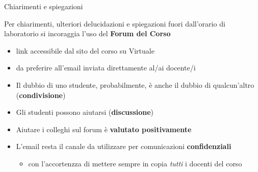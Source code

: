 \documentclass[presentation]{beamer}
\begin{document}
\begin{frame}{Chiarimenti e spiegazioni}

Per chiarimenti, ulteriori delucidazioni e spiegazioni fuori dall'orario di laboratorio
si incoraggia l'uso del \textbf{Forum del Corso}
\begin{itemize}
    \item link accessibile dal sito del corso su Virtuale
    \item da preferire all'email inviata direttamente al/ai docente/i
\end{itemize}

\begin{block}{}
    \begin{itemize}
        \item Il dubbio di uno studente, probabilmente, è anche il dubbio di qualcun'altro (\textbf{condivisione})
        \item Gli studenti possono aiutarsi (\textbf{discussione})
        \item Aiutare i colleghi sul forum è \textbf{valutato positivamente}
    \end{itemize}
\end{block}
\vfill
\begin{itemize}
\item L'email resta il canale da utilizzare per comunicazioni \textbf{confidenziali}
    \begin{itemize}
        \item con l'accortenzza di mettere sempre in copia \emph{tutti} i docenti del corso
    \end{itemize}
\end{itemize}



\end{frame}
\end{document}
